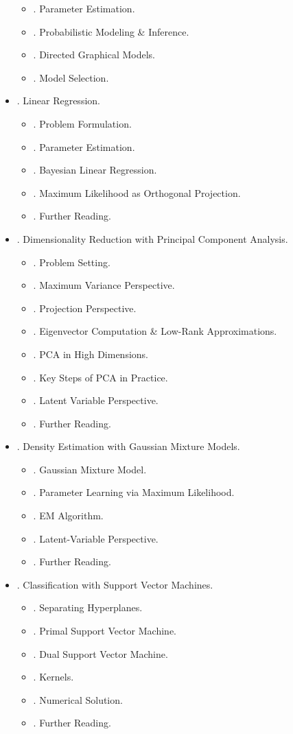 \documentclass{article}
\begin{document}
\begin{itemize}
\begin{itemize}
		\item {. Parameter Estimation.}
		\item {. Probabilistic Modeling \& Inference.}
		\item {. Directed Graphical Models.}
		\item {. Model Selection.}
	\end{itemize}
	\item {. Linear Regression.}
	\begin{itemize}
		\item {. Problem Formulation.}
		\item {. Parameter Estimation.}
		\item {. Bayesian Linear Regression.}
		\item {. Maximum Likelihood as Orthogonal Projection.}
		\item {. Further Reading.}
	\end{itemize}
	\item {. Dimensionality Reduction with Principal Component Analysis.}
	\begin{itemize}
		\item {. Problem Setting.}
		\item {. Maximum Variance Perspective.}
		\item {. Projection Perspective.}
		\item {. Eigenvector Computation \& Low-Rank Approximations.}
		\item {. PCA in High Dimensions.}
		\item {. Key Steps of PCA in Practice.}
		\item {. Latent Variable Perspective.}
		\item {. Further Reading.}
	\end{itemize}
	\item {. Density Estimation with Gaussian Mixture Models.}
	\begin{itemize}
		\item {. Gaussian Mixture Model.}
		\item {. Parameter Learning via Maximum Likelihood.}
		\item {. EM Algorithm.}
		\item {. Latent-Variable Perspective.}
		\item {. Further Reading.}
	\end{itemize}
	\item {. Classification with Support Vector Machines.}
	\begin{itemize}
		\item {. Separating Hyperplanes.}
		\item {. Primal Support Vector Machine.}
		\item {. Dual Support Vector Machine.}
		\item {. Kernels.}
		\item {. Numerical Solution.}
		\item {. Further Reading.}
	\end{itemize}
\end{itemize}
\end{document}
